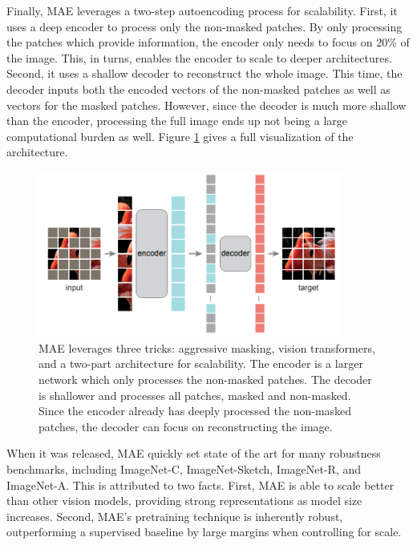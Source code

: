 \documentclass{article}
\begin{document}
Finally, MAE leverages a two-step autoencoding process for scalability. First, it uses a deep encoder to process only the non-masked patches. By only processing the patches which provide information, the encoder only needs to focus on 20\% of the image. This, in turns, enables the encoder to scale to deeper architectures. Second, it uses a shallow decoder to reconstruct the whole image. This time, the decoder inputs both the encoded vectors of the non-masked patches as well as vectors for the masked patches. However, since the decoder is much more shallow than the encoder, processing the full image ends up not being a large computational burden as well. Figure \ref{fig:mae} gives a full visualization of the architecture.

\begin{figure}
    \centering
    \includegraphics[width=10cm]{images/mae.png}
    \caption{MAE leverages three tricks: aggressive masking, vision transformers, and a two-part architecture for scalability. The encoder is a larger network which only processes the non-masked patches. The decoder is shallower and processes all patches, masked and non-masked. Since the encoder already has deeply processed the non-masked patches, the decoder can focus on reconstructing the image.}
    \label{fig:mae}
\end{figure}

When it was released, MAE quickly set state of the art for many robustness benchmarks, including ImageNet-C, ImageNet-Sketch, ImageNet-R, and ImageNet-A. This is attributed to two facts. First, MAE is able to scale better than other vision models, providing strong representations as model size increases. Second, MAE's pretraining technique is inherently robust, outperforming a supervised baseline by large margins when controlling for scale.
\end{document}
